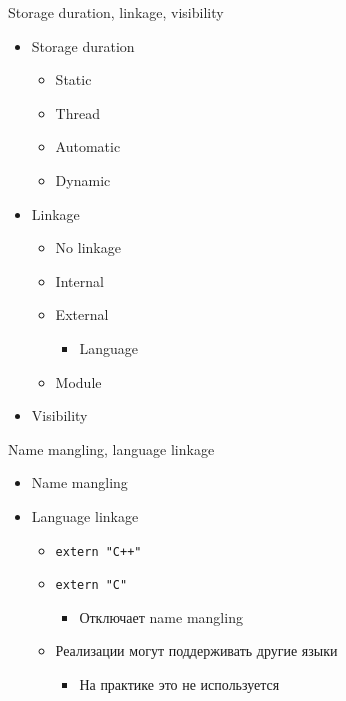 \documentclass{beamer}
\begin{document}
\begin{frame}{Storage duration, linkage, visibility}
    \begin{itemize}
        \item Storage duration
            \begin{itemize}
                \item Static
                \item Thread
                \item Automatic
                \item Dynamic
            \end{itemize}
        \item Linkage
            \begin{itemize}
                \item No linkage
                \item Internal
                \item External
                    \begin{itemize}
                        \item Language
                    \end{itemize}
                \item Module
            \end{itemize}
        \item Visibility
    \end{itemize}
\end{frame}

\begin{frame}{Name mangling, language linkage}
    \begin{itemize}
        \item Name mangling
        \item Language linkage
            \begin{itemize}
                \item \texttt{extern "C++"}
                \item \texttt{extern "C"}
                \begin{itemize}
                    \item Отключает name mangling
                \end{itemize}
            \item Реализации могут поддерживать другие языки
                \begin{itemize}
                    \item На практике это не используется
                \end{itemize}
            \end{itemize}
    \end{itemize}
\end{frame}
\end{document}
